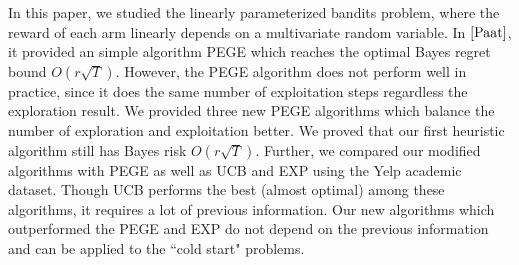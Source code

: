 \documentclass{article}
\theoremstyle{plain}
\theoremstyle{definition}
\begin{document}
In this paper, we studied the linearly parameterized bandits problem, where the reward of each arm linearly depends on a multivariate random variable. In $\cite{Paat}$, it provided an simple algorithm PEGE which reaches the optimal Bayes regret bound $O(r\sqrt{T})$. However, the PEGE algorithm does not perform well in practice, since it does the same number of exploitation steps regardless the exploration result. We provided three new PEGE algorithms which balance the number of exploration and exploitation better. We proved that our first heuristic algorithm still has Bayes risk $O(r\sqrt{T})$. Further, we compared our modified algorithms with PEGE as well as UCB and EXP using the Yelp academic dataset. Though UCB performs the best (almost optimal) among these algorithms, it requires a lot of previous information. Our new algorithms which outperformed the PEGE and EXP do not depend on the previous information and can be applied to the ``cold start" problems.


\nocite{langley00}





%
%
%
\end{document}
